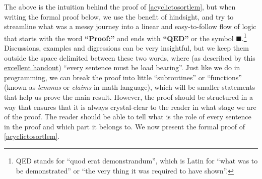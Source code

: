 The above is the intuition behind the proof of \cref{acyclictosortlem},
but when writing the formal proof below, we use the benefit of
hindsight, and try to streamline what was a messy journey into a linear
and easy-to-follow flow of logic that starts with the word
\textbf{``Proof:''} and ends with \textbf{``QED''} or the symbol
\(\blacksquare\).\footnote{QED stands for ``quod erat demonstrandum'',
  which is Latin for ``what was to be demonstrated'' or ``the very thing
  it was required to have shown''.} Discussions, examples and
digressions can be very insightful, but we keep them outside the space
delimited between these two words, where (as described by this
\href{http://web.stanford.edu/class/cs103/handouts/120\%20Proofwriting\%20Checklist.pdf}{excellent
handout}) ``every sentence must be load bearing''. Just like we do in
programming, we can break the proof into little ``subroutines'' or
``functions'' (known as \emph{lemmas} or \emph{claims} in math
language), which will be smaller statements that help us prove the main
result. However, the proof should be structured in a way that ensures
that it is always crystal-clear to the reader in what stage we are of
the proof. The reader should be able to tell what is the role of every
sentence in the proof and which part it belongs to. We now present the
formal proof of \cref{acyclictosortlem}.

